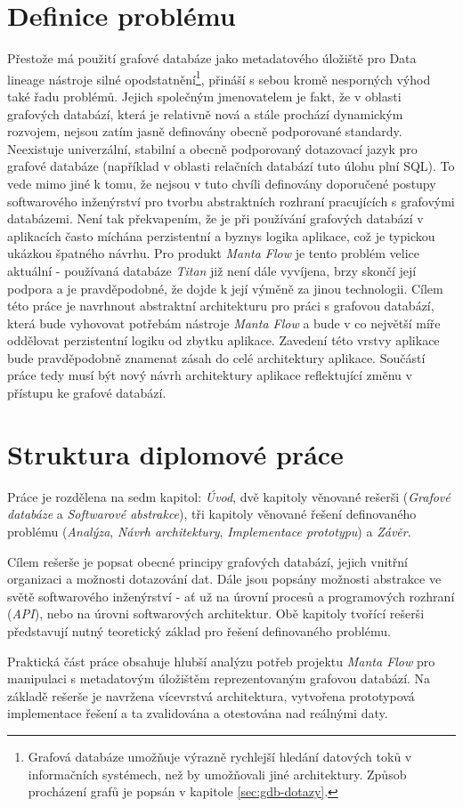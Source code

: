 \section{Definice problému}
Přestože má použití grafové databáze jako metadatového úložiště pro Data lineage nástroje silné opodstatnění\footnote{Grafová databáze umožňuje výrazně rychlejší hledání datových toků v informačních systémech, než by umožňovali jiné architektury. Způsob procházení grafů je popsán v kapitole \ref{sec:gdb-dotazy}.}, přináší s sebou kromě nesporných výhod také řadu problémů. Jejich společným jmenovatelem je fakt, že v oblasti grafových databází, která je relativně nová a stále prochází dynamickým rozvojem, nejsou zatím jasně definovány obecně podporované standardy. Neexistuje univerzální, stabilní a obecně podporovaný dotazovací jazyk pro grafové databáze (například v oblasti relačních databází tuto úlohu plní SQL). To vede mimo jiné k tomu, že nejsou v tuto chvíli definovány doporučené postupy softwarového inženýrství pro tvorbu abstraktních rozhraní pracujících s grafovými databázemi. Není tak překvapením, že je při používání grafových databází v aplikacích často míchána perzistentní a byznys logika aplikace, což je typickou ukázkou špatného návrhu\cite{Taylor09}. Pro produkt \textit{Manta Flow} je tento problém velice aktuální - používaná databáze \textit{Titan} již není dále vyvíjena, brzy skončí její podpora \cite{Titan04} a je pravděpodobné, že dojde k její výměně za jinou technologii. Cílem této práce je navrhnout abstraktní architekturu pro práci s grafovou databází, která bude vyhovovat potřebám nástroje \textit{Manta Flow} a bude v co největší míře oddělovat perzistentní logiku od zbytku aplikace. Zavedení této vrstvy aplikace bude pravděpodobně znamenat zásah do celé architektury aplikace. Součástí práce tedy musí být nový návrh architektury aplikace reflektující změnu v přístupu ke grafové databází.

\section{Struktura diplomové práce}
Práce je rozdělena na sedm kapitol: \textit{Úvod}, dvě kapitoly věnované rešerši (\textit{Grafové databáze} a \textit{Softwarové abstrakce}), tři kapitoly věnované řešení definovaného problému (\textit{Analýza}, \textit{Návrh architektury}, \textit{Implementace prototypu}) a \textit{Závěr}.

Cílem rešerše je popsat obecné principy grafových databází, jejich vnitřní organizaci a možnosti dotazování dat. Dále jsou popsány možnosti abstrakce ve světě softwarového inženýrství - ať už na úrovní procesů a programových rozhraní (\textit{API}), nebo na úrovni softwarových architektur. Obě kapitoly tvořící rešerši představují nutný teoretický základ pro řešení definovaného problému.

Praktická část práce obsahuje hlubší analýzu potřeb projektu \textit{Manta Flow} pro manipulaci s metadatovým úložištěm reprezentovaným grafovou databází. Na základě rešerše je navržena vícevrstvá architektura, vytvořena prototypová implementace řešení a ta zvalidována a otestována nad reálnými daty.
